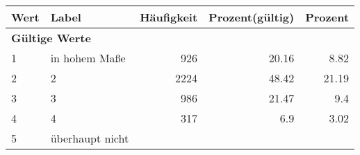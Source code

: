      \begin{longtable}{lXrrr}
     \toprule
     \textbf{Wert} & \textbf{Label} & \textbf{Häufigkeit} & \textbf{Prozent(gültig)} & \textbf{Prozent} \\
     \endhead
     \midrule
     \multicolumn{5}{l}{\textbf{Gültige Werte}}\\

     1 &
     \multicolumn{1}{X}{ in hohem Maße   } &


       \num{926} &
       \num[round-mode=places,round-precision=2]{20.16} &
         \num[round-mode=places,round-precision=2]{8.82} \\

     2 &
     \multicolumn{1}{X}{ 2   } &


       \num{2224} &
       \num[round-mode=places,round-precision=2]{48.42} &
         \num[round-mode=places,round-precision=2]{21.19} \\

     3 &
     \multicolumn{1}{X}{ 3   } &


       \num{986} &
       \num[round-mode=places,round-precision=2]{21.47} &
         \num[round-mode=places,round-precision=2]{9.4} \\

     4 &
     \multicolumn{1}{X}{ 4   } &


       \num{317} &
       \num[round-mode=places,round-precision=2]{6.9} &
         \num[round-mode=places,round-precision=2]{3.02} \\

     5 &
     \multicolumn{1}{X}{ überhaupt nicht   } &



\end{longtable}
